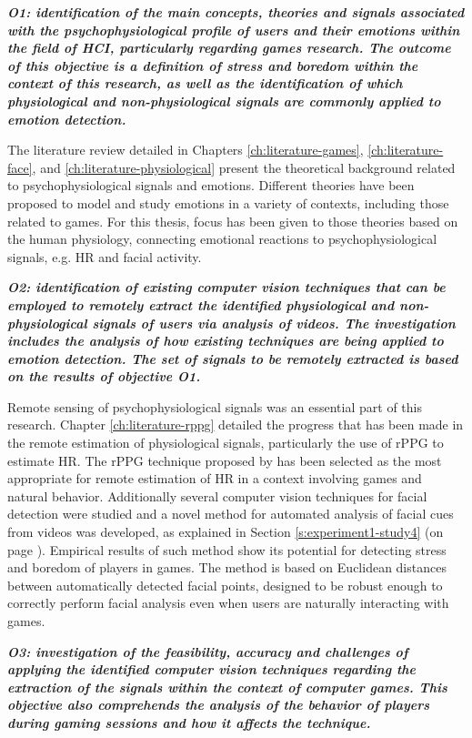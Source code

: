 \textit{\textbf{O1: identification of the main concepts, theories and signals associated with the psychophysiological profile of users and their emotions within the field of HCI, particularly regarding games research. The outcome of this objective is a definition of stress and boredom within the context of this research, as well as the identification of which physiological and non-physiological signals are commonly applied to emotion detection.}}

The literature review detailed in Chapters \ref{ch:literature-games}, \ref{ch:literature-face}, and \ref{ch:literature-physiological} present the theoretical background related to psychophysiological signals and emotions. Different theories have been proposed to model and study emotions in a variety of contexts, including those related to games. For this thesis, focus has been given to those theories based on the human physiology, connecting emotional reactions to psychophysiological signals, e.g. HR and facial activity.

\textit{\textbf{O2: identification of existing computer vision techniques that can be employed to remotely extract the identified physiological and non-physiological signals of users via analysis of videos. The investigation includes the analysis of how existing techniques are being applied to emotion detection. The set of signals to be remotely extracted is based on the results of objective \textbf{O1}.}}

Remote sensing of psychophysiological signals was an essential part of this research. Chapter \ref{ch:literature-rppg} detailed the progress that has been made in the remote estimation of physiological signals, particularly the use of rPPG to estimate HR. The rPPG technique proposed by \textcite{poh2011advancements} has been selected as the most appropriate for remote estimation of HR in a context involving games and natural behavior. Additionally several computer vision techniques for facial detection were studied and a novel method for automated analysis of facial cues from videos was developed, as explained in Section \ref{s:experiment1-study4} (on page \pageref{s:experiment1-study4}). Empirical results of such method show its potential for detecting stress and boredom of players in games. The method is based on Euclidean distances between automatically detected facial points, designed to be robust enough to correctly perform facial analysis even when users are naturally interacting with games.

\textit{\textbf{O3: investigation of the feasibility, accuracy and challenges of applying the identified computer vision techniques regarding the extraction of the signals within the context of computer games. This objective also comprehends the analysis of the behavior of players during gaming sessions and how it affects the technique.}}

